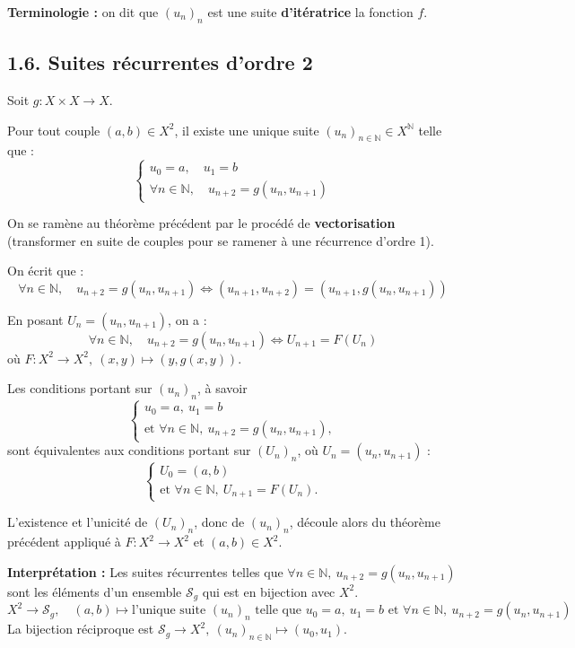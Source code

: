 \documentclass[a4paper,11pt]{article}
\newcommand{\N}{\mathbb{N}}
\newcommand{\mot}[1]{\textcolor{bordeaux}{\textbf{#1}}}
\begin{document}
\textbf{Terminologie :} on dit que $(u_n)_n$ est une suite \mot{d'itératrice} la fonction $f$.

\subsection{1.6. Suites récurrentes d'ordre 2}

\begin{proposition}
Soit $g : X \times X \to X$. 

Pour tout couple $(a, b) \in X^2$, il existe une unique suite $(u_n)_{n \in \N} \in X^{\N}$ telle que :
\[
\begin{cases}
u_0 = a, \quad u_1 = b \\
\forall n \in \N, \quad u_{n+2} = g(u_n, u_{n+1})
\end{cases}
\]
\end{proposition}

\begin{demonstration}
On se ramène au théorème précédent par le procédé de \mot{vectorisation} (transformer en suite de couples pour se ramener à une récurrence d'ordre 1).

On écrit que :
\[
\forall n \in \N, \quad u_{n+2} = g(u_n, u_{n+1}) \iff (u_{n+1}, u_{n+2}) = (u_{n+1}, g(u_n, u_{n+1}))
\]

En posant $U_n = (u_n, u_{n+1})$, on a :
\[
\forall n \in \N, \quad u_{n+2} = g(u_n, u_{n+1}) \iff U_{n+1} = F(U_n)
\]
où $F : X^2 \to X^2, \ (x, y) \mapsto (y, g(x, y))$.

Les conditions portant sur $(u_n)_n$, à savoir
\[
\begin{cases}
u_0 = a, \ u_1 = b \\
\text{et } \forall n \in \mathbb{N}, \ u_{n+2} = g(u_n, u_{n+1}),
\end{cases}
\]
sont équivalentes aux conditions portant sur $(U_n)_n$, où $U_n = (u_n, u_{n+1})$ :
\[
\begin{cases}
U_0 = (a, b) \\
\text{et } \forall n \in \mathbb{N}, \ U_{n+1} = F(U_n).
\end{cases}
\]

L'existence et l'unicité de $(U_n)_n$, donc de $(u_n)_n$, découle alors du théorème précédent appliqué à $F : X^2 \to X^2$ et $(a, b) \in X^2$.
\end{demonstration}

\textbf{Interprétation :} Les suites récurrentes telles que $\forall n \in \N, \ u_{n+2} = g(u_n, u_{n+1})$ sont les éléments d'un ensemble $\mathcal{S}_g$ qui est en bijection avec $X^2$.
\[
X^2 \longrightarrow \mathcal{S}_g, \quad (a, b) \longmapsto \text{l'unique suite } (u_n)_n \text{ telle que } u_0=a, \ u_1=b \text{ et } \forall n \in \N, \ u_{n+2} = g(u_n, u_{n+1})
\]
La bijection réciproque est $\mathcal{S}_g \to X^2, \ (u_n)_{n \in \N} \mapsto (u_0, u_1)$.
\end{document}
